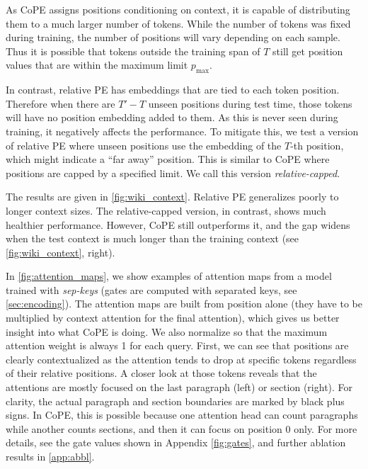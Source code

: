 \documentclass{article}
\newcommand{\ours}{CoPE\xspace}
\begin{document}
As \ours{} assigns positions conditioning on context, it is capable of distributing them to a much larger number of tokens.
While the number of tokens was fixed during training, the number of positions will vary depending on each sample.
Thus it is possible that tokens outside the training span of $T$ still get position values that are within the maximum limit $p_\text{max}$.

In contrast, relative PE has embeddings that are tied to each token position.
Therefore when there are $T'-T$ unseen positions during test time, those tokens will have no position embedding added to them.
As this is never seen during training, it negatively affects the performance.
To mitigate this, we test a version of relative PE where unseen positions use the embedding of the $T$-th position, which might indicate a ``far away'' position.
This is similar to \ours{} where positions are capped by a specified limit.
We call this version \emph{relative-capped}.

The results are given in \cref{fig:wiki_context}.
Relative PE generalizes poorly to longer context sizes.
The relative-capped version, in contrast, shows much healthier performance.
However, \ours{} still outperforms it, and the gap widens when the test context is much longer than the training context (see \cref{fig:wiki_context}, right). 

In \cref{fig:attention_maps}, we show examples of attention maps from a model trained with {\em sep-keys} (gates are computed with separated keys, see \cref{sec:encoding}).
The attention maps are built from position alone (they have to be multiplied by context attention for the final attention), which gives us better insight into what \ours{} is doing. 
We also normalize so that the maximum attention weight is always 1 for each query.
First, we can see that positions are clearly contextualized as the attention tends to drop at specific tokens regardless of their relative positions.
A closer look at those tokens reveals that the attentions are mostly focused on the last paragraph (left) or section (right).
For clarity, the actual paragraph and section boundaries are marked by black plus signs.
In \ours{}, this is possible because one attention head can count paragraphs while another counts sections, and then it can focus on position 0 only.
For more details, see the gate values shown in  Appendix \cref{fig:gates}, and further ablation results in \cref{app:abbl}.
\end{document}
